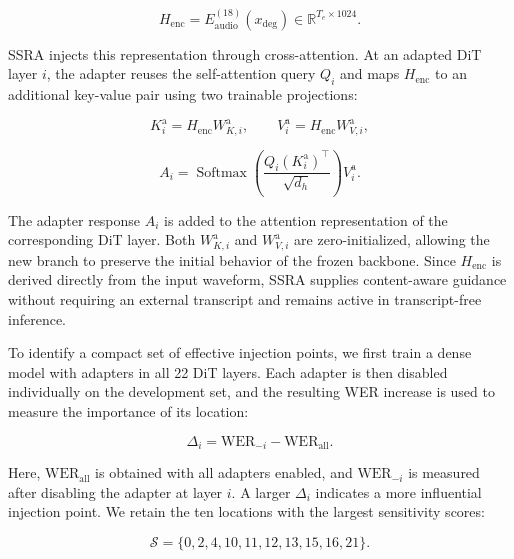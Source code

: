 \documentclass{article}
\begin{document}
\begin{equation}
  H_{\mathrm{enc}}
  =E_{\mathrm{audio}}^{(18)}(x_{\mathrm{deg}})
  \in\mathbb{R}^{T_e\times 1024}.
\end{equation}

SSRA injects this representation through cross-attention. At an adapted DiT layer $i$, the adapter reuses the self-attention query $Q_i$ and maps $H_{\mathrm{enc}}$ to an additional key-value pair using two trainable projections:

\begin{equation}
  K_i^{\mathrm{a}}=H_{\mathrm{enc}}W_{K,i}^{\mathrm{a}},
  \qquad
  V_i^{\mathrm{a}}=H_{\mathrm{enc}}W_{V,i}^{\mathrm{a}},
\end{equation}

\begin{equation}
  A_i
  =\operatorname{Softmax}\!\left(
  \frac{Q_i(K_i^{\mathrm{a}})^{\top}}{\sqrt{d_h}}
  \right)V_i^{\mathrm{a}}.
\end{equation}

The adapter response $A_i$ is added to the attention representation of the corresponding DiT layer. Both $W_{K,i}^{\mathrm{a}}$ and $W_{V,i}^{\mathrm{a}}$ are zero-initialized, allowing the new branch to preserve the initial behavior of the frozen backbone. Since $H_{\mathrm{enc}}$ is derived directly from the input waveform, SSRA supplies content-aware guidance without requiring an external transcript and remains active in transcript-free inference.

To identify a compact set of effective injection points, we first train a dense model with adapters in all 22 DiT layers. Each adapter is then disabled individually on the development set, and the resulting WER increase is used to measure the importance of its location:

\begin{equation}
  \Delta_i=\mathrm{WER}_{-i}-\mathrm{WER}_{\mathrm{all}}.
\end{equation}

Here, $\mathrm{WER}_{\mathrm{all}}$ is obtained with all adapters enabled, and $\mathrm{WER}_{-i}$ is measured after disabling the adapter at layer $i$. A larger $\Delta_i$ indicates a more influential injection point. We retain the ten locations with the largest sensitivity scores:

\begin{equation}
  \mathcal{S}=\{0,2,4,10,11,12,13,15,16,21\}.
\end{equation}
\end{document}
